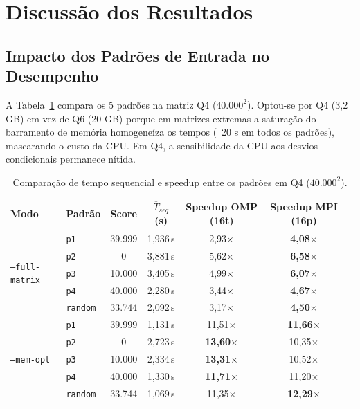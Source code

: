 \section{Discussão dos Resultados}
\label{sec:discussao}

\subsection{Impacto dos Padrões de Entrada no Desempenho}
\label{sec:impacto_padroes}

A Tabela~\ref{tab:comp_padroes} compara os 5 padrões na matriz Q4 ($40.000^2$). Optou-se por Q4 (3,2 GB) em vez de Q6 (20 GB) porque em matrizes extremas a saturação do barramento de memória homogeneíza os tempos (~20 s em todos os padrões), mascarando o custo da CPU. Em Q4, a sensibilidade da CPU aos desvios condicionais permanece nítida.

\begin{table}[H]
\centering
\small
\caption{Comparação de tempo sequencial e speedup entre os padrões em Q4 ($40.000^2$).}
\label{tab:comp_padroes}
\begin{tabular}{@{}llccccc@{}}
\toprule
\textbf{Modo} & \textbf{Padrão} & \textbf{Score} & $\overline{T}_{seq}$ (s) & \textbf{Speedup OMP (16t)} & \textbf{Speedup MPI (16p)} \\ \midrule
\multirow{5}{*}{\texttt{--full-matrix}} 
 & \texttt{p1}     & 39.999 & 1{,}936\,s & 2{,}93$\times$  & \textbf{4{,}08$\times$} \\
 & \texttt{p2}     & 0      & 3{,}881\,s & 5{,}62$\times$  & \textbf{6{,}58$\times$} \\
 & \texttt{p3}     & 10.000 & 3{,}405\,s & 4{,}99$\times$  & \textbf{6{,}07$\times$} \\
 & \texttt{p4}     & 40.000 & 2{,}280\,s & 3{,}44$\times$  & \textbf{4{,}67$\times$} \\
 & \texttt{random} & 33.744 & 2{,}092\,s & 3{,}17$\times$  & \textbf{4{,}50$\times$} \\ \midrule
\multirow{5}{*}{\texttt{--mem-opt}} 
 & \texttt{p1}     & 39.999 & 1{,}131\,s & 11{,}51$\times$ & \textbf{11{,}66$\times$} \\
 & \texttt{p2}     & 0      & 2{,}723\,s & \textbf{13{,}60$\times$} & 10{,}35$\times$ \\
 & \texttt{p3}     & 10.000 & 2{,}334\,s & \textbf{13{,}31$\times$} & 10{,}52$\times$ \\
 & \texttt{p4}     & 40.000 & 1{,}330\,s & \textbf{11{,}71$\times$} & 11{,}20$\times$ \\
 & \texttt{random} & 33.744 & 1{,}069\,s & 11{,}35$\times$ & \textbf{12{,}29$\times$} \\ \bottomrule
\end{tabular}
\end{table}

